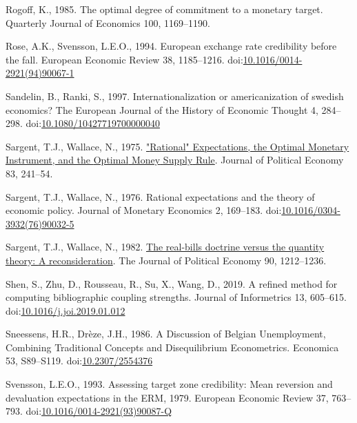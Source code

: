 \documentclass[]{elsarticle} %
\newlength{\cslhangindent}
\newlength{\cslentryspacingunit} %
\newenvironment{CSLReferences}[2] %
 {%
  \setlength{\parindent}{0pt}
  \ifodd #1
  \let\oldpar\par
  \def\par{\hangindent=\cslhangindent\oldpar}
  \fi
  \setlength{\parskip}{#2\cslentryspacingunit}
 }%
 {}
\begin{document}
\begin{CSLReferences}{1}{0}
\leavevmode{}%
Rogoff, K., 1985. The optimal degree of commitment to a monetary target.
Quarterly Journal of Economics 100, 1169--1190.

\leavevmode{}%
Rose, A.K., Svensson, L.E.O., 1994. European exchange rate credibility
before the fall. European Economic Review 38, 1185--1216.
doi:\href{https://doi.org/10.1016/0014-2921(94)90067-1}{10.1016/0014-2921(94)90067-1}

\leavevmode{}%
Sandelin, B., Ranki, S., 1997. Internationalization or americanization
of swedish economics? The European Journal of the History of Economic
Thought 4, 284--298.
doi:\href{https://doi.org/10.1080/10427719700000040}{10.1080/10427719700000040}

\leavevmode{}%
Sargent, T.J., Wallace, N., 1975.
\href{http://econpapers.repec.org/article/ucpjpolec/v_3A83_3Ay_3A1975_3Ai_3A2_3Ap_3A241-54.htm}{"{Rational}"
{Expectations}, the {Optimal} {Monetary} {Instrument}, and the {Optimal}
{Money} {Supply} {Rule}}. Journal of Political Economy 83, 241--54.

\leavevmode{}%
Sargent, T.J., Wallace, N., 1976. Rational expectations and the theory
of economic policy. Journal of Monetary Economics 2, 169--183.
doi:\href{https://doi.org/10.1016/0304-3932(76)90032-5}{10.1016/0304-3932(76)90032-5}

\leavevmode{}%
Sargent, T.J., Wallace, N., 1982.
\href{http://www.jstor.org/stable/1830945}{The real-bills doctrine
versus the quantity theory: {A} reconsideration}. The Journal of
Political Economy 90, 1212--1236.

\leavevmode{}%
Shen, S., Zhu, D., Rousseau, R., Su, X., Wang, D., 2019. A refined
method for computing bibliographic coupling strengths. Journal of
Informetrics 13, 605--615.
doi:\href{https://doi.org/10.1016/j.joi.2019.01.012}{10.1016/j.joi.2019.01.012}

\leavevmode{}%
Sneessens, H.R., Drèze, J.H., 1986. A {Discussion} of {Belgian
Unemployment}, {Combining Traditional Concepts} and {Disequilibrium
Econometrics}. Economica 53, S89--S119.
doi:\href{https://doi.org/10.2307/2554376}{10.2307/2554376}

\leavevmode{}%
Svensson, L.E.O., 1993. Assessing target zone credibility: {Mean}
reversion and devaluation expectations in the {ERM},
1979. European Economic Review 37, 763--793.
doi:\href{https://doi.org/10.1016/0014-2921(93)90087-Q}{10.1016/0014-2921(93)90087-Q}


\end{CSLReferences}
\end{document}
